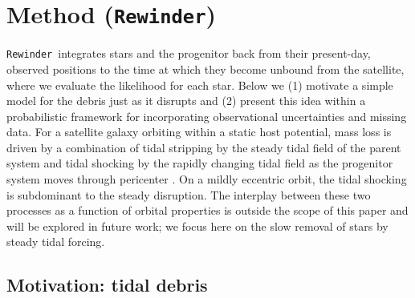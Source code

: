 \documentclass[letterpaper,12pt,preprint]{aastex}
\newcommand{\rewinder}{\texttt{Rewinder}}
\begin{document}
\section{Method (\rewinder)}\label{sec:method}

\rewinder\ integrates stars and the progenitor back from their present-day, observed positions to the time at which they become unbound from the satellite, where we evaluate the likelihood for each star. Below we (1) motivate a simple model for the debris just as it disrupts and (2) present this idea within a probabilistic framework for incorporating observational uncertainties and missing data. For a satellite galaxy orbiting within a static host potential, mass loss is driven by a combination of tidal stripping by the steady tidal field of the parent system and tidal shocking by the rapidly changing tidal field as the progenitor system moves through pericenter \citep[e.g.,][]{choi09}. On a mildly eccentric orbit, the tidal shocking is subdominant to the steady disruption. The interplay between these two processes as a function of orbital properties is outside the scope of this paper and will be explored in future work; we focus here on the slow removal of stars by steady tidal forcing. 

\subsection{Motivation: tidal debris}\label{sec:debris}
\end{document}
